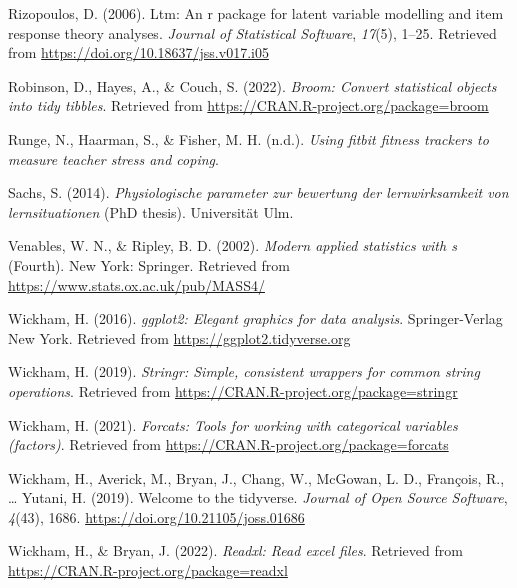 \documentclass[
  man]{apa6}
\newlength{\cslhangindent}
\newlength{\cslentryspacingunit} %
\newenvironment{CSLReferences}[2] %
 {%
  \setlength{\parindent}{0pt}
  \ifodd #1
  \let\oldpar\par
  \def\par{\hangindent=\cslhangindent\oldpar}
  \fi
  \setlength{\parskip}{#2\cslentryspacingunit}
 }%
 {}
\begin{document}
\begin{CSLReferences}{1}{0}
\leavevmode{}%
Rizopoulos, D. (2006). Ltm: An r package for latent variable modelling and item response theory analyses. \emph{Journal of Statistical Software}, \emph{17}(5), 1--25. Retrieved from \url{https://doi.org/10.18637/jss.v017.i05}

\leavevmode{}%
Robinson, D., Hayes, A., \& Couch, S. (2022). \emph{Broom: Convert statistical objects into tidy tibbles}. Retrieved from \url{https://CRAN.R-project.org/package=broom}

\leavevmode{}%
Runge, N., Haarman, S., \& Fisher, M. H. (n.d.). \emph{Using fitbit fitness trackers to measure teacher stress and coping}.

\leavevmode{}%
Sachs, S. (2014). \emph{Physiologische parameter zur bewertung der lernwirksamkeit von lernsituationen} (PhD thesis). Universit{ä}t Ulm.

\leavevmode{}%
Venables, W. N., \& Ripley, B. D. (2002). \emph{Modern applied statistics with s} (Fourth). New York: Springer. Retrieved from \url{https://www.stats.ox.ac.uk/pub/MASS4/}

\leavevmode{}%
Wickham, H. (2016). \emph{ggplot2: Elegant graphics for data analysis}. Springer-Verlag New York. Retrieved from \url{https://ggplot2.tidyverse.org}

\leavevmode{}%
Wickham, H. (2019). \emph{Stringr: Simple, consistent wrappers for common string operations}. Retrieved from \url{https://CRAN.R-project.org/package=stringr}

\leavevmode{}%
Wickham, H. (2021). \emph{Forcats: Tools for working with categorical variables (factors)}. Retrieved from \url{https://CRAN.R-project.org/package=forcats}

\leavevmode{}%
Wickham, H., Averick, M., Bryan, J., Chang, W., McGowan, L. D., François, R., \ldots{} Yutani, H. (2019). Welcome to the {tidyverse}. \emph{Journal of Open Source Software}, \emph{4}(43), 1686. \url{https://doi.org/10.21105/joss.01686}

\leavevmode{}%
Wickham, H., \& Bryan, J. (2022). \emph{Readxl: Read excel files}. Retrieved from \url{https://CRAN.R-project.org/package=readxl}


\end{CSLReferences}
\end{document}
